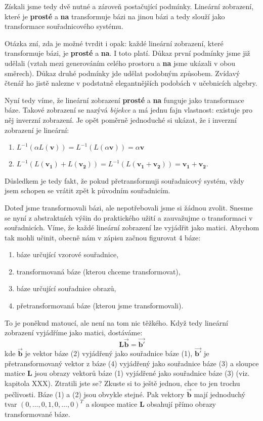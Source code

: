\documentclass[a5paper,12pt]{amsbook}
\theoremstyle{definition}
\newcommand{\myscalar}[1]{#1}
\newcommand{\myvec}[1]{\bm{#1}}
\newcommand{\mycoord}[1]{\overrightarrow{\mathbf{#1}}}
\newcommand{\mymatrix}[1]{\mathbf{#1}}
\newcommand{\mymap}[1]{#1}
\begin{document}
Získali jsme tedy dvě nutné a zároveň postačující podmínky. Lineární zobrazení, které 
je \textbf{prosté} a \textbf{na} transformuje bázi na jinou bázi a tedy slouží jako transformace
souřadnicového systému.

Otázka zní, zda je možné tvrdit i opak: každé lineární zobrazení, které transformuje bázi,
je \textbf{prosté} a \textbf{na}. I toto platí. Důkaz první podmínky jsme již udělali (vztah
mezi generováním celého prostoru a \textbf{na} jsme ukázali v obou směrech). Důkaz
druhé podmínky jde udělat podobným způsobem. Zvídavý čtenář ho jistě nalezne v podstatně
elegantnějších podobách v učebnicích algebry.

Nyní tedy víme, že lineární zobrazení \textbf{prosté} a \textbf{na} funguje jako transformace
báze. Takové zobrazení se nazývá \textit{bijekce} a má jednu fajn vlastnost: existuje pro něj
inverzní zobrazení. Je opět poměrně jednoduché si ukázat, že i inverzní zobrazení je lineární:
\begin{enumerate}
  \item $\mymap{L}^{-1}(\myscalar{\alpha}\mymap{L}(\myvec{v})) 
      = \mymap{L^{-1}}(\mymap{L}(\myscalar{\alpha}\myvec{v})) = \myscalar{\alpha}\myvec{v}$
  \item $\mymap{L}^{-1}(\mymap{L}(\myvec{v_1}) + \mymap{L}(\myvec{v_2}))
      = \mymap{L}^{-1}(\mymap{L}(\myvec{v_1} + \myvec{v_2}))
      = \myvec{v_1} + \myvec{v_2}$.
\end{enumerate}
Důsledkem je tedy fakt, že pokud přetransformuji souřadnicový systém, vždy jsem schopen
se vrátit zpět k původním souřadnicím.

Doteď jsme transformovali bázi, ale nepotřebovali jsme si žádnou zvolit. Snesme se nyní
z abstraktních výšin do praktického užití a zauvažujme o transformaci v souřadnicích.
Víme, že každé lineární zobrazení lze vyjádřit jako matici. Abychom tak mohli učinit,
obecně nám v zápisu začnou figurovat 4 báze:
\begin{enumerate}
  \item báze určující vzorové souřadnice,
  \item transformovaná báze (kterou chceme transformovat),
  \item báze určující souřadnice obrazů,
  \item přetransformovaná báze (kterou jsme transformovali).
\end{enumerate}
To je poněkud matoucí, ale není na tom nic těžkého. Když tedy lineární zobrazení vyjádříme
jako matici, dostáváme:
\begin{equation*}
\mymatrix{L}\mycoord{b} = \mycoord{b'}
\end{equation*}
kde $\mycoord{b}$ je vektor báze (2) vyjádřený jako souřadnice báze (1), $\mycoord{b'}$ je
přetransformovaný vektor z báze (4) vyjádřený jako souřadnice báze (3) a sloupce matice
$\mymatrix{L}$ jsou obrazy vektorů báze (1) vyjádřené jako souřadnice báze (3) (viz. kapitola
XXX). Ztratili jste se? Zkuste si to ještě jednou, chce to jen trochu pečlivosti. Báze
(1) a (2) jsou obvykle stejné. Pak vektory $\mycoord{b}$ mají jednoduchý tvar 
$(0, \ldots, 0, 1, 0, \ldots, 0)^T$ a sloupce matice $\mymatrix{L}$ obsahují přímo obrazy
transformované báze.
\end{document}
